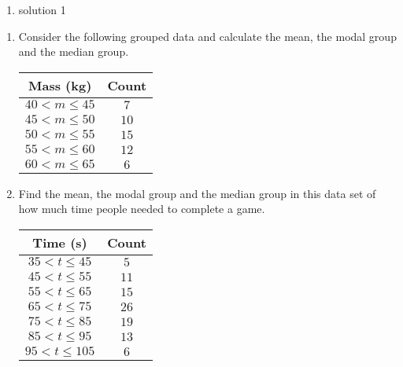  \begin{solutions}{}{
\begin{enumerate}[itemsep=5pt, label=\textbf{\arabic*}. ] 


\item solution 1

\end{enumerate}}
\end{solutions}


\begin{exercises}{}{
  \begin{enumerate}[itemsep=8pt, label=\textbf{\arabic*}.]
  \item Consider the following grouped data and calculate the mean,
    the modal group and the median group.
\\
    \begin{center}
      \begin{tabular}{|c|c|}\hline
        \textbf{Mass (kg)} & \textbf{Count} \\\hline
        $40 < m \le 45$ & $7$ \\\hline
        $45 < m \le 50$ & $10$ \\\hline
        $50 < m \le 55$ & $15$ \\\hline
        $55 < m \le 60$ & $12$ \\\hline
        $60 < m \le 65$ & $6$ \\\hline
      \end{tabular}
    \end{center}
  \item Find the mean, the modal group and the median group in this
    data set of how much time people needed to complete a game.
\\
    \begin{center}
      \begin{tabular}{|c|c|} \hline
       \textbf{Time (s)} & \textbf{Count} \\ \hline
        $35 < t \le 45$ & $5$ \\\hline
        $45 < t \le 55$ & $11$ \\\hline
        $55 < t \le 65$ & $15$ \\\hline
        $65 < t \le 75$ & $26$ \\\hline
        $75 < t \le 85$ & $19$ \\\hline
        $85 < t \le 95$ & $13$ \\\hline
        $95 < t \le 105$ & $6$ \\\hline
      \end{tabular}

\end{center}
\end{enumerate}}
\end{exercises}

